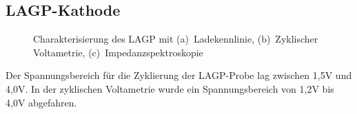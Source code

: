 \documentclass[a4paper, 11pt, headsepline,footsepline,twoside,abstract]{scrbook}
\begin{document}
\subsection{LAGP-Kathode}
\begin{figure}
   \centering
       \vspace{3mm}
       \vspace{3mm}
       \vspace{3mm}
	\caption{Charakterisierung des LAGP mit (a)~Ladekennlinie, (b)~Zyklischer Voltametrie, (c)~Impedanzspektroskopie}
   	\label{ec_LAGP}
\end{figure}
Der Spannungsbereich für die Zyklierung der LAGP-Probe lag zwischen 1,5V und 4,0V. In der zyklischen Voltametrie wurde ein Spannungsbereich von 1,2V bis 4,0V abgefahren.
\end{document}

